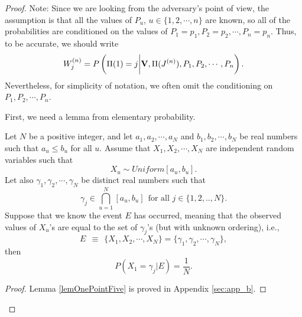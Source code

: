 \begin{proof}
Note: Since we are looking from the adversary's point of view, the assumption is that all the values of $P_u$, $u \in \{1,2,\cdots,n\}$ are known, so all of the probabilities are conditioned on the values of $P_1=p_1, P_2=p_2, \cdots, P_n=p_n$. Thus, to be accurate, we should write
\[W_j^{(n)}= P\left(\Pi(1)=j \bigg{|} \textbf{V}, \Pi (J^{(n)}), P_1, P_2, \cdots, P_n\right).\]
Nevertheless, for simplicity of notation, we often omit the conditioning on $P_1, P_2, \cdots, P_n$.

First, we need a lemma from elementary probability.

\begin{lem}
	\label{lemOnePointFive}
	Let $N$ be a positive integer, and let $a_1, a_2, \cdots, a_N$ and $b_1, b_2, \cdots, b_N$ be real numbers such that $a_u \leq b_u$ for all $u$. Assume that $X_1, X_2, \cdots, X_N$ are independent random variables such that
\[X_u \sim Uniform [a_u,b_u]. \]
Let also $\gamma_1, \gamma_2, \cdots, \gamma_N$ be distinct real numbers such that
\[ \gamma_j \in \bigcap_{u=1}^{N} [a_u, b_u] \ \ \textrm{for all }j \in \{1,2,..,N\}.\]
Suppose that we know the event $E$ has occurred, meaning that the observed values of $X_u$'s are equal to the set of $\gamma_j$'s (but with unknown ordering), i.e.,
\[E \ \ \equiv \ \ \{X_1, X_2, \cdots, X_N\}= \{ \gamma_1, \gamma_2, \cdots, \gamma_N \},\] then
\[P\left(X_1=\gamma_j |E\right)=\frac{1}{N}. \]
\end{lem}

\begin{proof}
Lemma \ref{lemOnePointFive} is proved in Appendix \ref{sec:app_b}.
\end{proof}




\end{proof}
